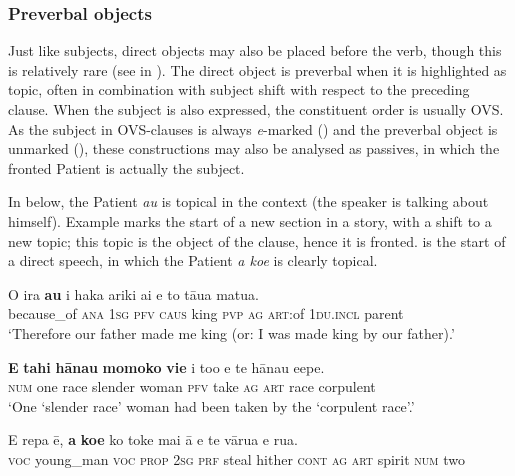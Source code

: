 \subsubsection[Preverbal objects]{Preverbal objects}\label{sec:8.6.1.2}
Just like subjects, direct objects may also be placed before the verb, though this is relatively rare (see  in ). The direct object is preverbal when it is highlighted as topic, often in combination with subject shift with respect to the preceding clause. When the subject is also expressed, the constituent order is usually OVS. As the subject in OVS-clauses is always \textit{e}{}-marked () and the preverbal object is unmarked (), these constructions may also be analysed as passives, in which the fronted Patient is actually the subject. 

In  below, the Patient \textit{au} is topical in the context (the speaker is talking about himself). Example  marks the start of a new section in a story, with a shift to a new topic; this topic is the object of the clause, hence it is fronted.  is the start of a direct speech, in which the Patient \textit{a koe} is clearly topical.

\ea\label{ex:8.75}
\gll {\ꞌ}O ira \textbf{au} i haka {\ꞌ}ariki ai e to tāua matu{\ꞌ}a. \\
because\_of \textsc{ana} \textsc{1sg} \textsc{pfv} \textsc{caus} king \textsc{pvp} \textsc{ag} \textsc{art}:of \textsc{1du.incl} parent \\

\glt 
‘Therefore our father made me king (or: I was made king by our father).’ \textstyleExampleref{[Ley-2-06.036]}
\z

\ea\label{ex:8.76}
\gll \textbf{E} \textbf{tahi} \textbf{hānau} \textbf{momoko} \textbf{vi{\ꞌ}e} i to{\ꞌ}o e te hānau {\ꞌ}e{\ꞌ}epe. \\
\textsc{num} one race slender woman \textsc{pfv} take \textsc{ag} \textsc{art} race corpulent \\

\glt 
‘One ‘slender race’ woman had been taken by the ‘corpulent race’.’ \textstyleExampleref{[Ley-3-06.020]}
\z

\ea\label{ex:8.77}
\gll E repa ē, \textbf{a} \textbf{koe} ko toke mai {\ꞌ}ā e te vārua e rua. \\
\textsc{voc} young\_man \textsc{voc} \textsc{prop} \textsc{2sg} \textsc{prf} steal hither \textsc{cont} \textsc{ag} \textsc{art} spirit \textsc{num} two \\

